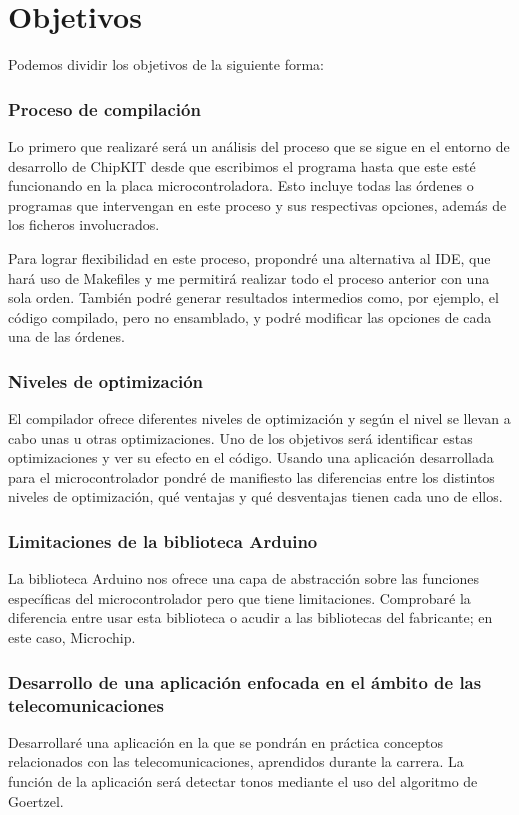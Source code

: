 \section{Objetivos}
Podemos dividir los objetivos de la siguiente forma:

\subsubsection{Proceso de compilación}
Lo primero que realizaré será un análisis del proceso que se sigue en el entorno de desarrollo de ChipKIT desde que escribimos el programa hasta que este esté funcionando en la placa microcontroladora.  Esto incluye todas las órdenes o programas que intervengan en este proceso y sus respectivas opciones, además de los ficheros involucrados.

Para lograr flexibilidad en este proceso, propondré una alternativa al IDE, que hará uso de Makefiles y me permitirá realizar todo el proceso anterior con una sola orden. También podré generar resultados intermedios como, por ejemplo, el código compilado, pero no ensamblado, y podré modificar las opciones de cada una de las órdenes.

\subsubsection{Niveles de optimización}
El compilador ofrece diferentes niveles de optimización y según el nivel se llevan a cabo unas u otras optimizaciones. Uno de los objetivos será identificar estas optimizaciones y ver su efecto en el código. Usando una aplicación desarrollada para el microcontrolador pondré de manifiesto las diferencias entre los distintos niveles de optimización, qué ventajas y qué desventajas tienen cada uno de ellos.

\subsubsection{Limitaciones de la biblioteca Arduino}
La biblioteca Arduino nos ofrece una capa de abstracción sobre las funciones específicas del microcontrolador pero que tiene limitaciones. Comprobaré la diferencia entre usar esta biblioteca o acudir a las bibliotecas del fabricante; en este caso, Microchip.

\subsubsection{Desarrollo de una aplicación enfocada en el ámbito de las telecomunicaciones}
Desarrollaré una aplicación en la que se pondrán en práctica conceptos relacionados con las telecomunicaciones, aprendidos durante la carrera. La función de la aplicación será detectar tonos mediante el uso del algoritmo de Goertzel.



